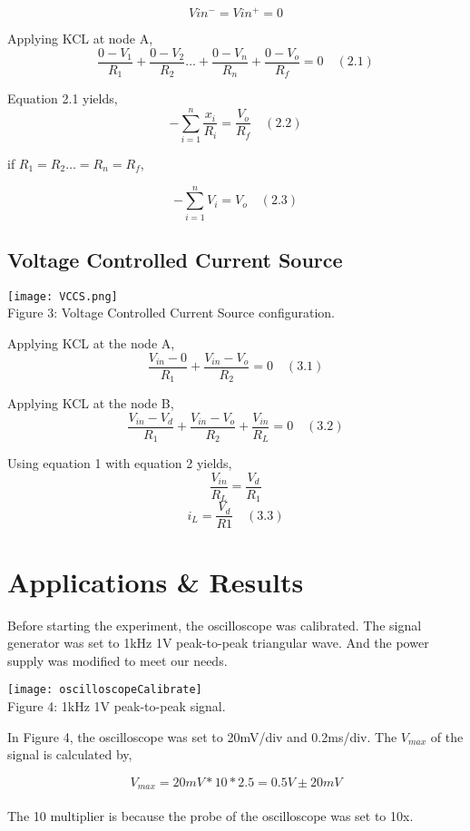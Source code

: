 \documentclass{article}
\begin{document}
\[V{in^-} = V{in^+} = 0\]

Applying KCL at node A,
\[\frac{0-V_1}{R_1} + \frac{0-V_2}{R_2}\dots+\frac{0-V_n}{R_n} + \frac{0-V_o}{R_f} = 0 \quad (2.1)\]

Equation 2.1 yields,
\[-\sum_{i=1}^n \frac{x_i}{R_i} = \frac{V_o}{R_f} \quad (2.2)\]

if $R_1 = R_2 \dots = R_n = R_f$,
    
\[-\sum_{i=1}^n V_i= V_o \quad (2.3)\]

\subsection{Voltage Controlled Current Source}

\begin{center}
    \texttt{[image: VCCS.png]} \\
    Figure 3: Voltage Controlled Current Source configuration.
\end{center}

Applying KCL at the node A,
\[\frac{V_{in}-0}{R_1} + \frac{V_{in}-V_o}{R_2} = 0 \quad (3.1)\]

Applying KCL at the node B,
\[\frac{V_{in}-V_d}{R_1} + \frac{V_{in} - V_o}{R_2} + \frac{V_{in}}{R_L} = 0 \quad (3.2)\]

Using equation 1 with equation 2 yields,
\[\frac{V_{in}}{R_L} = \frac{V_d}{R_1}\]
\[i_L = \frac{V_d}{R1} \quad (3.3)\] 

\section{Applications \& Results}

Before starting the experiment, the oscilloscope was calibrated. The signal generator was set to 1kHz 1V peak-to-peak triangular wave. And the power supply was modified to meet our needs.

\begin{center}
\texttt{[image: oscilloscopeCalibrate]} \\
Figure 4: 1kHz 1V peak-to-peak signal.
\end{center}

In Figure 4, the oscilloscope was set to 20mV/div and 0.2ms/div. The $V_{max}$ of the signal is calculated by,

\[V_{max} = 20mV * 10 * 2.5 = 0.5V \pm 20mV\] \\

The 10 multiplier is because the probe of the oscilloscope was set to 10x.
\end{document}
